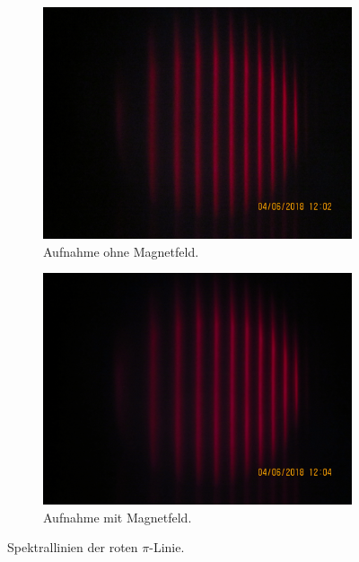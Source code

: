 \begin{figure}
  \centering
  \begin{subfigure}{0.48\textwidth}
    \centering
    \includegraphics[width=\textwidth]{graphics/aufnahmen/IMG_1629.jpg}
    \caption{Aufnahme ohne Magnetfeld.}
  \end{subfigure}
  \begin{subfigure}{0.48\textwidth}
    \centering
    \includegraphics[width=\textwidth]{graphics/aufnahmen/IMG_1630.jpg}
    \caption{Aufnahme mit Magnetfeld.}
  \end{subfigure}
  \caption{Spektrallinien der roten $\pi$-Linie.}
  \label{fig:r_pi}
\end{figure}

